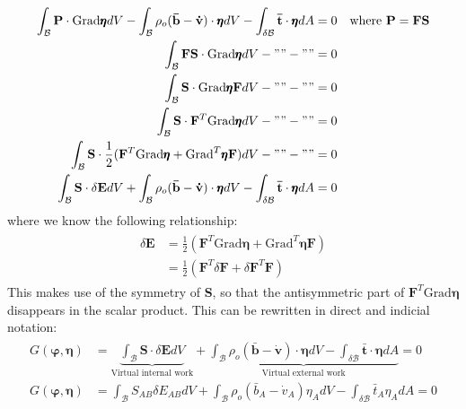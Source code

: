 \documentclass[12pt,3p]{article}
\numberwithin{equation}{section}
\begin{document}
\begin{align*}
\begin{split}
\int_{\mathcal{B}} \mathbf{P} \cdot \text{Grad} \pmb{\eta} dV - \int_{\mathcal{B}} \rho_o (\mathbf{\bar{b}} - \mathbf{\dot{v}}) \cdot \pmb{\eta} dV - \int_{\delta \mathcal{B}} \mathbf{\bar{t}} \cdot \pmb{\eta} dA &= 0 \quad \text{where } \mathbf{P = FS} \\
\int_{\mathcal{B}} \mathbf{FS} \cdot \text{Grad} \pmb{\eta} dV - "" - "" &= 0 \\
\int_{\mathcal{B}} \mathbf{S} \cdot \text{Grad} \pmb{\eta} \mathbf{F} dV - "" - "" &= 0 \\
\int_{\mathcal{B}} \mathbf{S} \cdot \mathbf{F}^T \text{Grad} \pmb{\eta} dV - "" - "" &= 0 \\
\int_{\mathcal{B}} \mathbf{S} \cdot \frac{1}{2} (\mathbf{F}^T \text{Grad} \pmb{\eta} + \text{Grad}^T \pmb{\eta} \mathbf{F}) dV - "" - "" &= 0 \\
\int_{\mathcal{B}} \mathbf{S} \cdot \delta \mathbf{E} dV + \int_{\mathcal{B}} \rho_o (\mathbf{\bar{b}} - \mathbf{\dot{v}}) \cdot \pmb{\eta} dV - \int_{\delta \mathcal{B}} \mathbf{\bar{t}} \cdot \pmb{\eta} dA &= 0
\end{split}
\end{align*}
where we know the following relationship:
\begin{align}
\begin{split}
\delta \mathbf{E} &= \frac{1}{2} (\mathbf{F}^T \text{Grad} \pmb{\eta} + \text{Grad}^T \pmb{\eta} \mathbf{F}) \\
			&= \frac{1}{2} (\mathbf{F}^T \delta \mathbf{F} + \delta \mathbf{F}^T \mathbf{F})
\end{split}
\end{align}
This makes use of the symmetry of \textbf{S}, so that the antisymmetric part of $\mathbf{F}^T \text{Grad} \pmb{\eta} $ disappears in the scalar product. This can be rewritten in direct and indicial notation: 
\begin{align}\label{359}
\begin{split}
G(\pmb{\varphi}, \pmb{\eta}) &= \underbrace{\int_{\mathcal{B}} \mathbf{S} \cdot \delta \mathbf{E} dV}_\text{Virtual internal work} + \underbrace{\int_{\mathcal{B}} \rho_o (\mathbf{\bar{b}} - \mathbf{\dot{v}}) \cdot \pmb{\eta} dV - \int_{\delta \mathcal{B}} \mathbf{\bar{t}} \cdot \pmb{\eta} dA}_\text{Virtual external work} = 0 \\
G(\pmb{\varphi}, \pmb{\eta}) &= \int_{\mathcal{B}} S_{AB} \delta E_{AB} dV + \int_{\mathcal{B}} \rho_o (\bar{b}_A - \dot{v}_A) \eta_A dV - \int_{\delta \mathcal{B}} \bar{t}_A \eta_A dA = 0
\end{split}
\end{align}
\end{document}
